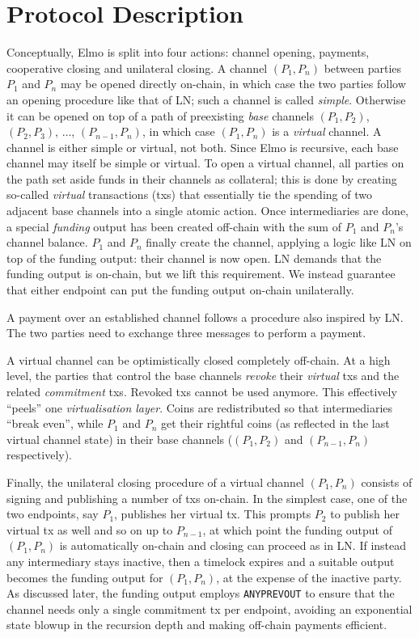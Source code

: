\section{Protocol Description}
  Conceptually, Elmo is split into four actions: channel opening,
  payments, cooperative closing and unilateral closing. A channel $(P_1, P_n)$
  between parties $P_1$ and $P_n$
  may be opened directly on-chain, in which case the two parties follow an
  opening procedure like that of LN; such a channel is called
  \emph{simple}.
  Otherwise it can be opened on top of a path
  of preexisting \emph{base} channels $(P_1, P_2)$, $(P_2, P_3)$, $\dots$,
  $(P_{n-1}, P_{n})$, in which case $(P_1, P_n)$ is a \emph{virtual}
  channel. A channel is either simple or virtual, not both. Since Elmo is
  recursive, each base channel may itself be simple or
  virtual. To open a virtual
  channel, all parties on the
  path set aside funds in their channels as
  collateral; this is done
  by creating so-called \emph{virtual} transactions (txs) that essentially
  tie the spending of two adjacent base channels into a single atomic action.
  Once intermediaries are done, a special \emph{funding} output has been
  created off-chain with the sum of $P_1$ and $P_n$'s channel
  balance. $P_1$ and $P_n$
  finally create the channel, applying a logic like LN on top of
  the funding output: their channel is now open. LN demands that the funding
  output is on-chain, but we lift this requirement. We instead guarantee that
  either endpoint can put the funding output on-chain unilaterally.

  A payment over an established channel follows a procedure also inspired by
  LN.
  The two parties need to exchange three messages to perform a payment.

  A virtual channel can be optimistically closed completely off-chain. At a high
  level, the parties that control the base channels \emph{revoke} their \emph{virtual}
  txs and the related \emph{commitment} txs. Revoked txs
  cannot be used anymore. This effectively ``peels'' one \emph{virtualisation
  layer}.
  Coins are redistributed so that intermediaries ``break even'', while $P_1$
  and $P_n$ get their rightful coins (as reflected in the last virtual channel
  state) in their base channels ($(P_1, P_2)$ and $(P_{n-1}, P_n)$
  respectively).

  Finally, the unilateral closing procedure of a virtual channel $(P_1, P_n)$
  consists of signing and publishing a number of
  txs on-chain. In the simplest case, one of the two endpoints, say
  $P_1$, publishes her virtual tx. This prompts $P_2$ to publish her
  virtual tx as well and so on up to $P_{n-1}$, at which point the
  funding output of $(P_1, P_n)$ is automatically on-chain and closing can
  proceed as in LN. If instead any intermediary stays inactive, then a timelock
  expires and a suitable output becomes the funding output for $(P_1, P_n)$, at
  the expense of the inactive party. As discussed later, the funding output
  employs \texttt{ANYPREVOUT} to ensure that the channel needs only a
  single commitment tx per endpoint, avoiding an exponential state blowup in the
  recursion depth and making off-chain payments efficient.

